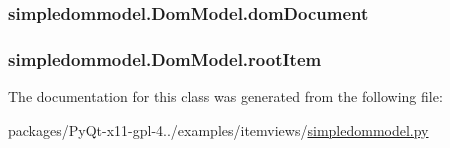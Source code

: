 \subsubsection[{dom\+Document}]{\setlength{\rightskip}{0pt plus 5cm}simpledommodel.\+Dom\+Model.\+dom\+Document}\label{classsimpledommodel_1_1DomModel_ad070abf4f0830206494123449c8bd3f3}
\hypertarget{classsimpledommodel_1_1DomModel_a242cb2fd1c8372e25c63c667041594d2}{}
\subsubsection[{root\+Item}]{\setlength{\rightskip}{0pt plus 5cm}simpledommodel.\+Dom\+Model.\+root\+Item}\label{classsimpledommodel_1_1DomModel_a242cb2fd1c8372e25c63c667041594d2}


The documentation for this class was generated from the following file\+:\begin{DoxyCompactItemize}
\item 
packages/\+Py\+Qt-\/x11-\/gpl-\/4../examples/itemviews/\hyperlink{simpledommodel_8py}{simpledommodel.\+py}\end{DoxyCompactItemize}
